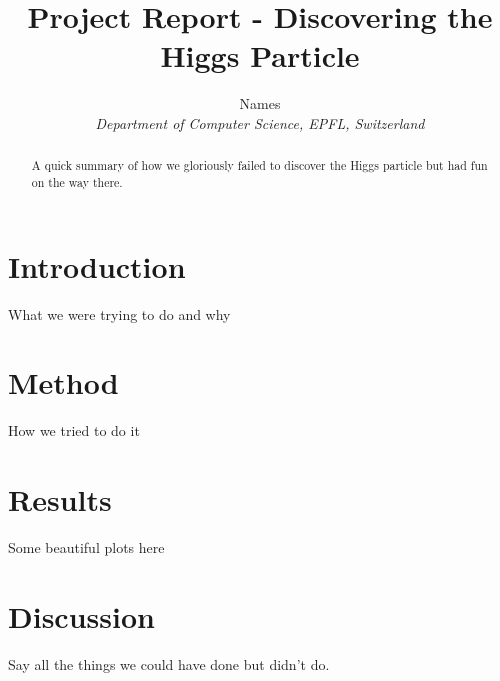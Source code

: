 \documentclass[10pt,conference,compsocconf]{IEEEtran}
\begin{document}
\title{Project Report - Discovering the Higgs Particle}

\author{
  Names\\
  \textit{Department of Computer Science, EPFL, Switzerland}
}

\maketitle

\begin{abstract}
A quick summary of how we gloriously failed to discover the Higgs particle but had fun on the way there.
\end{abstract}


\section{Introduction}
What we were trying to do and why

\section{Method}
How we tried to do it

\section{Results}
Some beautiful plots here

\section{Discussion}
Say all the things we could have done but didn't do.
\end{document}
